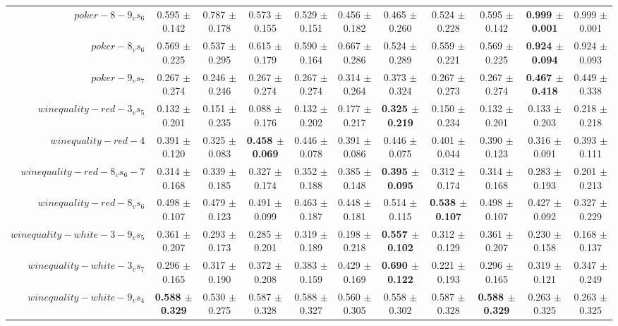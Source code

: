 \begin{table}[!ht]
{\begin{tabular}{r c c c c c c c c c c}
$poker-8-9_vs_6$ & 0.595 $\pm$ 0.142 & 0.787 $\pm$ 0.178 & 0.573 $\pm$ 0.155 & 0.529 $\pm$ 0.151 & 0.456 $\pm$ 0.182 & 0.465 $\pm$ 0.260 & 0.524 $\pm$ 0.228 & 0.595 $\pm$ 0.142 & \textbf{0.999 $\pm$ 0.001} & 0.999 $\pm$ 0.001 \\
$poker-8_vs_6$ & 0.569 $\pm$ 0.225 & 0.537 $\pm$ 0.295 & 0.615 $\pm$ 0.179 & 0.590 $\pm$ 0.164 & 0.667 $\pm$ 0.286 & 0.524 $\pm$ 0.289 & 0.559 $\pm$ 0.221 & 0.569 $\pm$ 0.225 & \textbf{0.924 $\pm$ 0.094} & 0.924 $\pm$ 0.093 \\
$poker-9_vs_7$ & 0.267 $\pm$ 0.274 & 0.246 $\pm$ 0.246 & 0.267 $\pm$ 0.274 & 0.267 $\pm$ 0.274 & 0.314 $\pm$ 0.264 & 0.373 $\pm$ 0.324 & 0.267 $\pm$ 0.273 & 0.267 $\pm$ 0.274 & \textbf{0.467 $\pm$ 0.418} & 0.449 $\pm$ 0.338 \\
$winequality-red-3_vs_5$ & 0.132 $\pm$ 0.201 & 0.151 $\pm$ 0.235 & 0.088 $\pm$ 0.176 & 0.132 $\pm$ 0.202 & 0.177 $\pm$ 0.217 & \textbf{0.325 $\pm$ 0.219} & 0.150 $\pm$ 0.234 & 0.132 $\pm$ 0.201 & 0.133 $\pm$ 0.203 & 0.218 $\pm$ 0.218 \\
$winequality-red-4$ & 0.391 $\pm$ 0.120 & 0.325 $\pm$ 0.083 & \textbf{0.458 $\pm$ 0.069} & 0.446 $\pm$ 0.078 & 0.391 $\pm$ 0.086 & 0.446 $\pm$ 0.075 & 0.401 $\pm$ 0.044 & 0.390 $\pm$ 0.123 & 0.316 $\pm$ 0.091 & 0.393 $\pm$ 0.111 \\
$winequality-red-8_vs_6-7$ & 0.314 $\pm$ 0.168 & 0.339 $\pm$ 0.185 & 0.327 $\pm$ 0.174 & 0.352 $\pm$ 0.188 & 0.385 $\pm$ 0.148 & \textbf{0.395 $\pm$ 0.095} & 0.312 $\pm$ 0.174 & 0.314 $\pm$ 0.168 & 0.283 $\pm$ 0.193 & 0.201 $\pm$ 0.213 \\
$winequality-red-8_vs_6$ & 0.498 $\pm$ 0.107 & 0.479 $\pm$ 0.123 & 0.491 $\pm$ 0.099 & 0.463 $\pm$ 0.187 & 0.448 $\pm$ 0.181 & 0.514 $\pm$ 0.115 & \textbf{0.538 $\pm$ 0.107} & 0.498 $\pm$ 0.107 & 0.427 $\pm$ 0.092 & 0.327 $\pm$ 0.229 \\
$winequality-white-3-9_vs_5$ & 0.361 $\pm$ 0.207 & 0.293 $\pm$ 0.173 & 0.285 $\pm$ 0.201 & 0.319 $\pm$ 0.189 & 0.198 $\pm$ 0.218 & \textbf{0.557 $\pm$ 0.102} & 0.312 $\pm$ 0.129 & 0.361 $\pm$ 0.207 & 0.230 $\pm$ 0.158 & 0.168 $\pm$ 0.137 \\
$winequality-white-3_vs_7$ & 0.296 $\pm$ 0.165 & 0.317 $\pm$ 0.190 & 0.372 $\pm$ 0.208 & 0.383 $\pm$ 0.159 & 0.429 $\pm$ 0.169 & \textbf{0.690 $\pm$ 0.122} & 0.221 $\pm$ 0.193 & 0.296 $\pm$ 0.165 & 0.319 $\pm$ 0.121 & 0.347 $\pm$ 0.249 \\
$winequality-white-9_vs_4$ & \textbf{0.588 $\pm$ 0.329} & 0.530 $\pm$ 0.275 & 0.587 $\pm$ 0.328 & 0.588 $\pm$ 0.327 & 0.560 $\pm$ 0.305 & 0.558 $\pm$ 0.302 & 0.587 $\pm$ 0.328 & \textbf{0.588 $\pm$ 0.329} & 0.263 $\pm$ 0.325 & 0.263 $\pm$ 0.325 \\

\end{tabular}}
\end{table}
